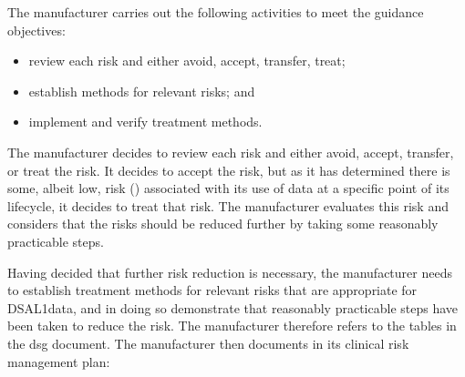 \begin{minipage}[t]{0.73\textwidth}
  The manufacturer carries out the following activities to meet the guidance objectives:
  \begin{itemize}
    \item review each risk and either avoid, accept, transfer, \gls{treat};
    \item establish  methods for relevant risks; and
    \item implement and verify \gls{treatment} methods.
  \end{itemize}
\end{minipage}
\begin{minipage}[t]{0.25\textwidth}
  \centering{}
\end{minipage}

The manufacturer decides to review each risk and either avoid, accept, transfer, or \gls{treat} the risk. It decides to accept the  risk, but as it has determined there is some, albeit low, risk () associated with its use of data at a specific point of its lifecycle, it decides to \gls{treat} that risk. The manufacturer evaluates this risk and considers that the risks should be reduced further by taking some reasonably practicable steps.

Having decided that further risk reduction is necessary, the manufacturer needs to establish \gls{treatment} methods for relevant risks that are appropriate for DSAL1data, and in doing so demonstrate that reasonably practicable steps have been taken to reduce the risk. The manufacturer therefore refers to the tables in the \gls{dsg} document. The manufacturer then documents in its clinical risk management plan:

